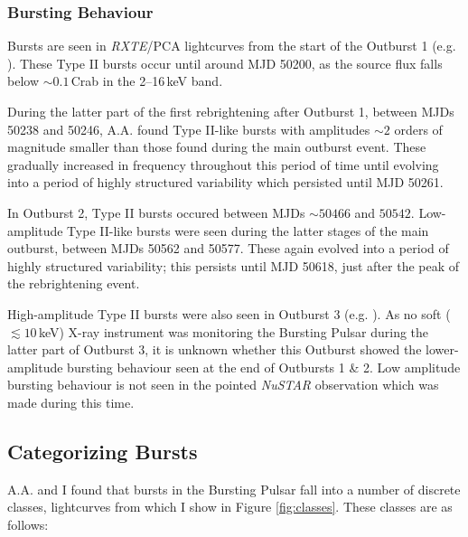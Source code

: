 \subsubsection{Bursting Behaviour}

\label{sec:bburstevo}

\par Bursts are seen in \textit{RXTE}/PCA lightcurves from the start of the Outburst 1 (e.g. \citealp{Kouveliotou_BP}).  These Type II bursts occur until around MJD 50200, as the source flux falls below $\sim0.1$\,Crab in the 2--16\,keV band.  
\par During the latter part of the first rebrightening after Outburst 1, between MJDs 50238 and 50246, \textsf{A.A.} found Type II-like bursts with amplitudes $\sim2$ orders of magnitude smaller than those found during the main outburst event.  These gradually increased in frequency throughout this period of time until evolving into a period of highly structured variability which persisted until MJD 50261.
\par In Outburst 2, Type II bursts occured between MJDs $\sim50466$ and $50542$.  Low-amplitude Type II-like bursts were seen during the latter stages of the main outburst, between MJDs 50562 and 50577.  These again evolved into a period of highly structured variability; this persists until MJD 50618, just after the peak of the rebrightening event.
\par High-amplitude Type II bursts were also seen in Outburst 3 (e.g. \citealp{Linares_NewBurst}).  As no soft ($\lesssim10\,$keV) X-ray instrument was monitoring the Bursting Pulsar during the latter part of Outburst 3, it is unknown whether this Outburst showed the lower-amplitude bursting behaviour seen at the end of Outbursts 1 \& 2.  Low amplitude bursting behaviour is not seen in the pointed \textit{NuSTAR} observation which was made during this time.

\subsection{Categorizing Bursts}

\label{sec:classes}

\par \textsf{A.A.} and I found that bursts in the Bursting Pulsar fall into a number of discrete classes, lightcurves from which I show in Figure \ref{fig:classes}.  These classes are as follows:

